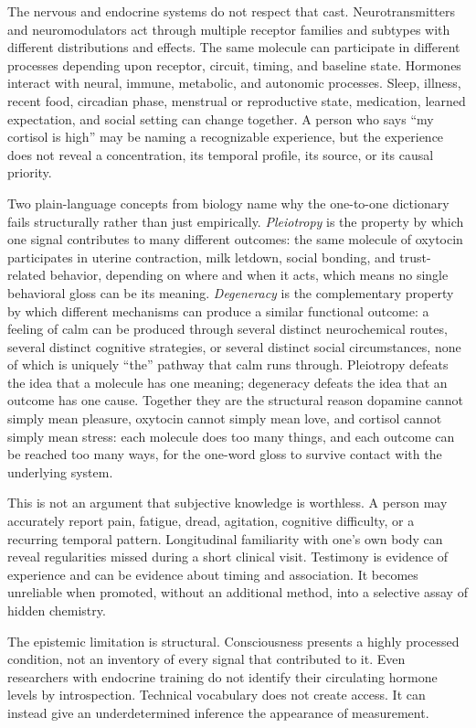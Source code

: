 \documentclass[11pt]{article}
\begin{document}
The nervous and endocrine systems do not respect that cast. Neurotransmitters and neuromodulators act through multiple receptor families and subtypes with different distributions and effects. The same molecule can participate in different processes depending upon receptor, circuit, timing, and baseline state. Hormones interact with neural, immune, metabolic, and autonomic processes. Sleep, illness, recent food, circadian phase, menstrual or reproductive state, medication, learned expectation, and social setting can change together. A person who says ``my cortisol is high'' may be naming a recognizable experience, but the experience does not reveal a concentration, its temporal profile, its source, or its causal priority.

Two plain-language concepts from biology name why the one-to-one dictionary fails structurally rather than just empirically. \emph{Pleiotropy} is the property by which one signal contributes to many different outcomes: the same molecule of oxytocin participates in uterine contraction, milk letdown, social bonding, and trust-related behavior, depending on where and when it acts, which means no single behavioral gloss can be its meaning. \emph{Degeneracy} is the complementary property by which different mechanisms can produce a similar functional outcome: a feeling of calm can be produced through several distinct neurochemical routes, several distinct cognitive strategies, or several distinct social circumstances, none of which is uniquely ``the'' pathway that calm runs through. Pleiotropy defeats the idea that a molecule has one meaning; degeneracy defeats the idea that an outcome has one cause. Together they are the structural reason dopamine cannot simply mean pleasure, oxytocin cannot simply mean love, and cortisol cannot simply mean stress: each molecule does too many things, and each outcome can be reached too many ways, for the one-word gloss to survive contact with the underlying system.

This is not an argument that subjective knowledge is worthless. A person may accurately report pain, fatigue, dread, agitation, cognitive difficulty, or a recurring temporal pattern. Longitudinal familiarity with one's own body can reveal regularities missed during a short clinical visit. Testimony is evidence of experience and can be evidence about timing and association. It becomes unreliable when promoted, without an additional method, into a selective assay of hidden chemistry.

The epistemic limitation is structural. Consciousness presents a highly processed condition, not an inventory of every signal that contributed to it. Even researchers with endocrine training do not identify their circulating hormone levels by introspection. Technical vocabulary does not create access. It can instead give an underdetermined inference the appearance of measurement.
\end{document}
